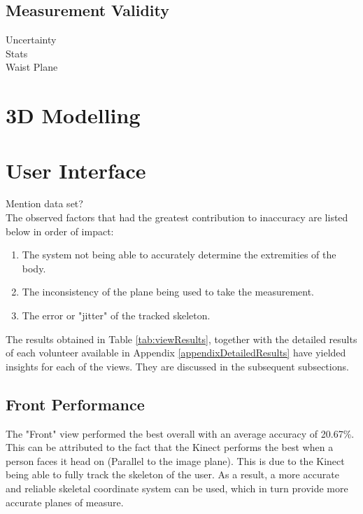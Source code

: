 \subsection{Measurement Validity}
Uncertainty\\
Stats\\
Waist Plane\\

\section{3D Modelling}

\section{User Interface}

\iffalse

Mention data set?\\

The observed factors that had the greatest contribution to inaccuracy are listed below in order of impact:

\begin{enumerate}
	\item The system not being able to accurately determine the extremities of the body.
	\item The inconsistency of the plane being used to take the measurement.
	\item The error or "jitter" of the tracked skeleton.
\end{enumerate}



The results obtained in Table \ref{tab:viewResults}, together with the detailed results of each volunteer available in Appendix \ref{appendixDetailedResults} have yielded insights for each of the views. They are discussed in the subsequent subsections. 

\subsection{Front Performance}

The "Front" view performed the best overall with an average accuracy of 20.67\%. This can be attributed to the fact that the Kinect performs the best when a person faces it head on (Parallel to the image plane). This is due to the Kinect being able to fully track the skeleton of the user. As a result, a more accurate and reliable skeletal coordinate system can be used, which in turn provide more accurate planes of measure. 

